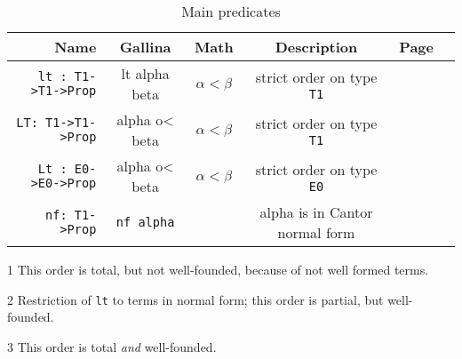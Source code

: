 \documentclass[a4paper]{book}
\begin{document}
\begin{table}[H]
  \centering
  \begin{threeparttable}
    \caption{Main predicates}
\begin{tabular}{|r | c|c|c|c|l|}
\hline
Name & Gallina&Math& Description& Page \\\hline
\texttt{lt : T1->T1->Prop}& lt alpha beta & $\alpha < \beta$& strict order on type \texttt{T1} \tnote{1} & \pageref{Predicates:lt-T1}\\
\texttt{LT: T1->T1->Prop}& alpha o< beta & $\alpha < \beta$& strict order on type \texttt{T1}   \tnote{2} & \pageref{Predicates:LT-T1}\\
\texttt{Lt : E0->E0->Prop} & alpha o< beta & $\alpha < \beta$& strict order on type \texttt{E0} \tnote{3} & \pageref{Predicates:Lt-E0} \\
\texttt{nf: T1->Prop} & \texttt{nf alpha} && alpha is in Cantor normal form & \pageref{Predicates:nf-T1}\\
\hline
\end{tabular}
\begin{tablenotes}
  \item[1] This order is total, but not well-founded, because of not well formed terms.
\item[2] Restriction of \texttt{lt} to terms in normal form; this order is partial, but well-founded.
\item[3] This order is total \emph{and} well-founded.
\end{tablenotes}
\end{threeparttable}
\end{table}
\end{document}
